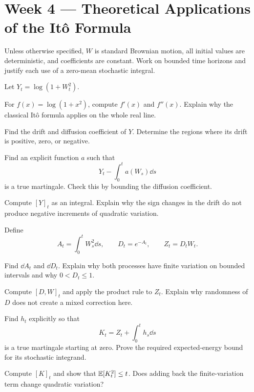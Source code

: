 \section{Week 4 --- Theoretical Applications of the It\^o Formula}

Unless otherwise specified, \(W\) is standard Brownian motion, all initial
values are deterministic, and coefficients are constant. Work on bounded
time horizons and justify each use of a zero-mean stochastic integral.

\ifIncludeCore

\setcounter{exercise}{0}
\begin{exercise}
Let \(Y_t=\log(1+W_t^2)\).
\begin{exparts}
  \item For \(f(x)=\log(1+x^2)\), compute \(f'(x)\) and \(f''(x)\).
  Explain why the classical It\^o formula applies on the whole real line.
  \item Find the drift and diffusion coefficient of \(Y\).
  Determine the regions where its drift is positive, zero, or negative.
  \item Find an explicit function \(a\) such that
  \[
  Y_t-\int_0^t a(W_s)\dd s
  \]
  is a true martingale. Check this by bounding the diffusion coefficient.
  \item Compute \([Y]_t\) as an integral. Explain why the sign changes
  in the drift do not produce negative increments of quadratic variation.
\end{exparts}
\end{exercise}

\begin{exercise}
Define
\[
A_t=\int_0^t W_s^2\dd s,
\qquad D_t=e^{-A_t},
\qquad Z_t=D_tW_t.
\]
\begin{exparts}
  \item Find \(\dd A_t\) and \(\dd D_t\). Explain why both processes
  have finite variation on bounded intervals and why \(0<D_t\leq1\).
  \item Compute \([D,W]_t\) and apply the product rule to \(Z_t\).
  Explain why randomness of \(D\) does not create a mixed correction here.
  \item Find \(h_t\) explicitly so that
  \[
  K_t=Z_t+\int_0^t h_s\dd s
  \]
  is a true martingale starting at zero. Prove the required expected-energy
  bound for its stochastic integrand.
  \item Compute \([K]_t\) and show that \(\mathbb E[K_t^2]\leq t\).
  Does adding back the finite-variation term change quadratic variation?
\end{exparts}
\end{exercise}

